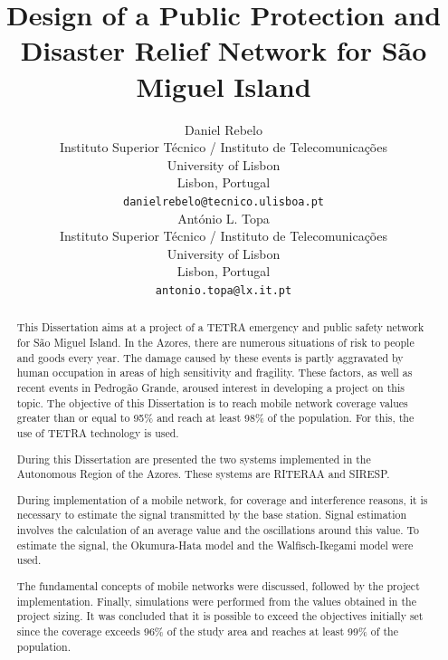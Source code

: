 \documentclass[letterpaper, 10 pt, conference]{ieeeconf}  %
\title{\LARGE \bf
Design of a Public Protection and Disaster Relief Network for São Miguel Island}
\author{ \parbox{3 in}{\centering Daniel Rebelo\\
        Instituto Superior Técnico / Instituto de Telecomunicações\\
        University of Lisbon\\
        Lisbon, Portugal\\
        {\tt\small danielrebelo@tecnico.ulisboa.pt}}
        \hspace*{ 0.5 in}
        \parbox{3 in}{ \centering António L. Topa\\
        Instituto Superior Técnico / Instituto de Telecomunicações\\
        University of Lisbon\\
        Lisbon, Portugal\\
        {\tt\small antonio.topa@lx.it.pt}}
}
\begin{document}
\maketitle
\thispagestyle{empty}
\pagestyle{empty}


\begin{abstract}
This Dissertation aims at a project of a TETRA emergency and public safety network for São Miguel Island. In the Azores, there are numerous situations of risk to people and goods every year. The damage caused by these events is partly aggravated by human occupation in areas of high sensitivity and fragility. These factors, as well as recent events in Pedrogão Grande, aroused interest in developing a project on this topic. The objective of this Dissertation is to reach mobile network coverage values greater than or equal to 95\% and reach at least 98\% of the population. For this, the use of TETRA technology is used.\par\noindent
During this Dissertation are presented the two systems implemented in the Autonomous Region of the Azores. These systems are RITERAA and SIRESP.\par\noindent
During implementation of a mobile network, for coverage and interference reasons, it is necessary to estimate the signal transmitted by the base station. Signal estimation involves the calculation of an average value and the oscillations around this value. To estimate the signal, the Okumura-Hata model and the Walfisch-Ikegami model were used.\par\noindent
The fundamental concepts of mobile networks were discussed, followed by the project implementation. Finally, simulations were performed from the values  obtained in the project sizing. It was concluded that it is possible to exceed the objectives initially set since the coverage exceeds 96\% of the study area and reaches at least 99\% of the population.
\end{abstract}


\end{document}
